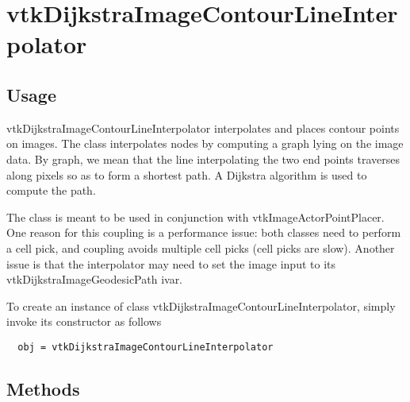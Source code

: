 \section{vtkDijkstraImageContourLineInterpolator}

\subsection{Usage}

 vtkDijkstraImageContourLineInterpolator interpolates and places
 contour points on images. The class interpolates nodes by
 computing a graph lying on the image data. By graph, we mean 
 that the line interpolating the two end points traverses along 
 pixels so as to form a shortest path. A Dijkstra algorithm is 
 used to compute the path.
 
 The class is meant to be used in conjunction with 
 vtkImageActorPointPlacer. One reason for this coupling is a 
 performance issue: both classes need to perform a cell pick, and 
 coupling avoids multiple cell picks (cell picks are slow).  Another
 issue is that the interpolator may need to set the image input to 
 its vtkDijkstraImageGeodesicPath ivar.


To create an instance of class vtkDijkstraImageContourLineInterpolator, simply
invoke its constructor as follows
\begin{verbatim}
  obj = vtkDijkstraImageContourLineInterpolator
\end{verbatim}
\subsection{Methods}


